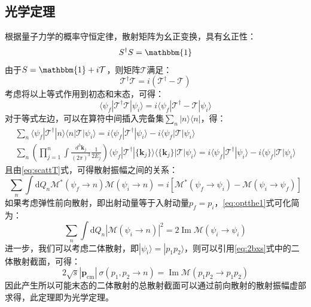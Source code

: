 \subsection{光学定理}
根据量子力学的概率守恒定律，散射矩阵为幺正变换，具有幺正性：
\begin{equation}
    S^\dagger S =\mathbbm{1}
\end{equation}
由于$S=\mathbbm{1} + i\mathcal{T}$，则矩阵$\mathcal{T}$满足：
\begin{equation}
\mathcal{T}^\dagger \mathcal{T}=i(\mathcal{T}^\dagger-\mathcal{T})
\end{equation}
考虑将以上等式作用到初态和末态，可得：
\begin{equation}
    \langle \psi_f| \mathcal{T}^\dagger \mathcal{T} |\psi_i\rangle=i\langle \psi_f| \mathcal{T}^\dagger-\mathcal{T} |\psi_i\rangle
\end{equation}
对于等式左边，可以在算符中间插入完备集$\sum_n|n\rangle\langle n|$，得：
\begin{gather}
    \sum_n \langle \psi_f| \mathcal{T}^\dagger|n\rangle \langle n| \mathcal{T} |\psi_i\rangle=i\langle \psi_f| \mathcal{T}^\dagger|\psi_i\rangle-i\langle \psi_f|\mathcal{T} |\psi_i\rangle\\
        \sum_n\left( \prod_{j=1}^n\int\frac{d^3 \boldsymbol{k}_j}{(2\pi)^3}\frac{1}{2E_j} \right) \langle \psi_f| \mathcal{T}^\dagger|\{\boldsymbol{k}_j\}\rangle \langle \{\boldsymbol{k}_j\}| \mathcal{T} |\psi_i\rangle=i\langle \psi_f| \mathcal{T}^\dagger|\psi_i\rangle-i\langle \psi_f|\mathcal{T} |\psi_i\rangle
\end{gather}
且由\eqref{eq:scattT}式，可得散射振幅之间的关系：
\begin{equation}
    \sum_n \int\mathrm{d}Q_n \mathcal{M}^*(\psi_f\rightarrow n) \mathcal{M}(\psi_i\rightarrow n) = i[\mathcal{M}^*(\psi_f\rightarrow\psi_i) - \mathcal{M}(\psi_i\rightarrow\psi_f)]
    \label{eq:optthe1}
\end{equation}
如果考虑弹性前向散射，即出射动量等于入射动量$p_f=p_i$，\eqref{eq:optthe1}式可化简为：
\begin{equation}
    \sum_n \int\mathrm{d}Q_n |\mathcal{M}(\psi_i\rightarrow n)|^2=2\operatorname{Im}\mathcal{M}(\psi_i\rightarrow\psi_i)
\end{equation}
进一步，我们可以考虑二体散射，即$|\psi_i\rangle = |p_1 p_2\rangle$，则可以引用\eqref{eq:2bxs}式中的二体散射截面，可得：
\begin{equation}
    2\sqrt{s} |\boldsymbol{p}_\mathrm{cm}| ~\sigma(p_1,p_2\rightarrow n) = \operatorname{Im}\mathcal{M}(p_1 p_2 \rightarrow p_1 p_2)
    \label{eq:optth}
\end{equation}
因此产生所以可能末态的二体散射的总散射截面可以通过前向散射的散射振幅虚部求得，此定理即为光学定理。

